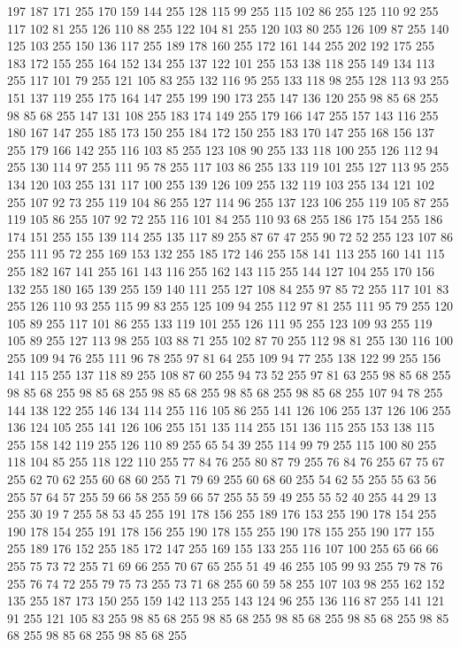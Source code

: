 197 187 171 255 170 159 144 255 128 115 99 255 115 102 86 255 125 110 92 255 117 102 81 255 126 110 88 255 122 104 81 255 120 103 80 255 126 109 87 255 140 125 103 255 150 136 117 255 189 178 160 255 172 161 144 255 202 192 175 255 183 172 155 255 164 152 134 255 137 122 101 255 153 138 118 255 149 134 113 255 117 101 79 255 121 105 83 255 132 116 95 255 133 118 98 255 128 113 93 255 151 137 119 255 175 164 147 255 199 190 173 255 147 136 120 255 98 85 68 255 98 85 68 255 147 131 108 255 183 174 149 255 179 166 147 255 157 143 116 255 180 167 147 255 185 173 150 255 184 172 150 255 183 170 147 255 168 156 137 255 179 166 142 255 116 103 85 255 123 108 90 255 133 118 100 255 126 112 94 255 130 114 97 255 111 95 78 255 117 103 86 255 133 119 101 255 127 113 95 255 134 120 103 255 131 117 100 255 139 126 109 255 132 119 103 255 134 121 102 255 107 92 73 255 119 104 86 255 127 114 96 255 137 123 106 255 119 105 87 255 119 105 86 255 107 92 72 255 116 101 84 255 110 93 68 255
186 175 154 255 186 174 151 255 155 139 114 255 135 117 89 255 87 67 47 255 90 72 52 255 123 107 86 255 111 95 72 255 169 153 132 255 185 172 146 255 158 141 113 255 160 141 115 255 182 167 141 255 161 143 116 255 162 143 115 255 144 127 104 255 170 156 132 255 180 165 139 255 159 140 111 255 127 108 84 255 97 85 72 255 117 101 83 255 126 110 93 255 115 99 83 255 125 109 94 255 112 97 81 255 111 95 79 255 120 105 89 255 117 101 86 255 133 119 101 255 126 111 95 255 123 109 93 255 119 105 89 255 127 113 98 255 103 88 71 255 102 87 70 255 112 98 81 255 130 116 100 255 109 94 76 255 111 96 78 255 97 81 64 255 109 94 77 255 138 122 99 255 156 141 115 255 137 118 89 255 108 87 60 255 94 73 52 255 97 81 63 255 98 85 68 255 98 85 68 255 98 85 68 255 98 85 68 255 98 85 68 255 98 85 68 255 107 94 78 255 144 138 122 255 146 134 114 255 116 105 86 255 141 126 106 255 137 126 106 255 136 124 105 255 141 126 106 255 151 135 114 255 151 136 115 255
153 138 115 255 158 142 119 255 126 110 89 255 65 54 39 255 114 99 79 255 115 100 80 255 118 104 85 255 118 122 110 255 77 84 76 255 80 87 79 255 76 84 76 255 67 75 67 255 62 70 62 255 60 68 60 255 71 79 69 255 60 68 60 255 54 62 55 255 55 63 56 255 57 64 57 255 59 66 58 255 59 66 57 255 55 59 49 255 55 52 40 255 44 29 13 255 30 19 7 255 58 53 45 255 191 178 156 255 189 176 153 255 190 178 154 255 190 178 154 255 191 178 156 255 190 178 155 255 190 178 155 255 190 177 155 255 189 176 152 255 185 172 147 255 169 155 133 255 116 107 100 255 65 66 66 255 75 73 72 255 71 69 66 255 70 67 65 255 51 49 46 255 105 99 93 255 79 78 76 255 76 74 72 255 79 75 73 255 73 71 68 255 60 59 58 255 107 103 98 255 162 152 135 255 187 173 150 255 159 142 113 255 143 124 96 255 136 116 87 255 141 121 91 255 121 105 83 255 98 85 68 255 98 85 68 255 98 85 68 255 98 85 68 255 98 85 68 255 98 85 68 255 98 85 68 255
